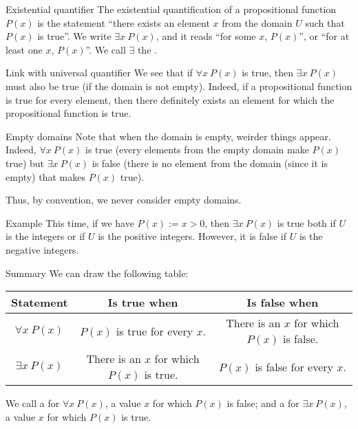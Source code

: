\documentclass{article}
\begin{document}
\begin{parag}{Existential quantifier}
    The existential quantification of a propositional function $P\left(x\right)$ is the statement ``there exists an element $x$ from the domain $U$ such that $P\left(x\right)$ is true''. We write $\exists x\ P\left(x\right)$, and it reads ``for some $x$, $P\left(x\right)$'', or ``for at least one $x$, $P\left(x\right)$''. We call $\exists$ the .

    \begin{subparag}{Link with universal quantifier}
        We see that if $\forall x\ P\left(x\right)$ is true, then $\exists x\ P\left(x\right)$ must also be true (if the domain is not empty). Indeed, if a propositional function is true for every element, then there definitely exists an element for which the propositional function is true.

    \end{subparag}
\end{parag}

\begin{parag}{Empty domains}
    Note that when the domain is empty, weirder things appear. Indeed, $\forall x\ P\left(x\right)$ is true (every elements from the empty domain make $P\left(x\right)$ true) but $\exists x\ P\left(x\right)$ is false (there is no element from the domain (since it is empty) that makes $P\left(x\right)$ true).
    
    Thus, by convention, we never consider empty domains.
\end{parag}


\begin{parag}{Example}
    This time, if we have $P\left(x\right) := x > 0$, then $\exists x\ P\left(x\right)$ is true both if $U$ is the integers or if $U$ is the positive integers. However, it is false if $U$ is the negative integers.
\end{parag}

\begin{parag}{Summary}
    We can draw the following table:
    \begin{center}
    \begin{tabular}{|c|c|c|}
        \hline
        \textbf{Statement} & \textbf{Is true when} & \textbf{Is false when} \\
        \hline
        $\forall x\ P\left(x\right)$ & $P\left(x\right)$ is true for every $x$. & There is an $x$ for which $P\left(x\right)$ is false. \\
        $\exists x\ P\left(x\right)$ & There is an $x$ for which $P\left(x\right)$ is true. & $P\left(x\right)$ is false for every $x$. \\
        \hline
    \end{tabular}
    \end{center}

    We call a  for $\forall x\ P\left(x\right)$, a value $x$ for which $P\left(x\right)$ is false; and a  for $\exists x\ P\left(x\right)$, a value $x$ for which $P\left(x\right)$ is true.
\end{parag}
\end{document}
